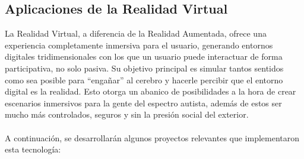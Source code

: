 \documentclass[12pt,twoside,titlepage]{report}
\begin{document}
\subsection{Aplicaciones de la Realidad Virtual}

La Realidad Virtual, a diferencia de la Realidad Aumentada, ofrece una experiencia completamente inmersiva para el usuario, generando entornos digitales tridimensionales con los que un usuario puede interactuar de forma participativa, no solo pasiva.
Su objetivo principal es simular tantos sentidos como sea posible para ``engañar'' al cerebro y hacerle percibir que el entorno digital es la realidad.
Esto otorga un abanico de posibilidades a la hora de crear escenarios inmersivos para la gente del espectro autista, además de estos ser mucho más controlados, seguros y sin la presión social del exterior.\\
\\
A continuación, se desarrollarán algunos proyectos relevantes que implementaron esta tecnología:
\end{document}
